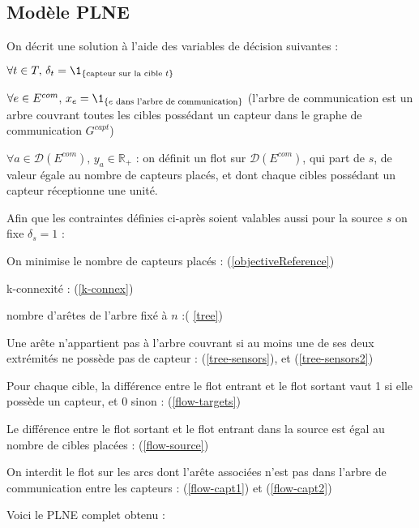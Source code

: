 \documentclass[12pt]{article}
\begin{document}
\subsection{Modèle PLNE}

\noindent On décrit une solution à l'aide des variables de décision suivantes :
\begin{bulletlist}
  \item $\forall t\in T,\, \delta_t = \1_{\{\text{capteur sur la cible } t\}}$
  \item $\forall e\in E^{com},\, x_e = \1_{\{e \text{ dans l'arbre de communication}\}}$ (l'arbre de communication est un arbre couvrant toutes les cibles possédant un capteur dans le graphe de communication $G^{capt}$)
  \item $\forall a\in \mathcal{D}(E^{com}),\, y_a\in \mathbb{R}_+$ : on définit un flot sur $\mathcal{D}(E^{com})$, qui part de $s$, de valeur égale au nombre de capteurs placés, et dont chaque cibles possédant un capteur réceptionne une unité.
\end{bulletlist}

\bigskip

\noindent Afin que les contraintes définies ci-après soient valables aussi pour la source $s$ on fixe $\delta_s = 1$ :

\begin{bulletlist}
  \item On minimise le nombre de capteurs placés : (\ref{objectiveReference})
  \item k-connexité : (\ref{k-connex})
  \item nombre d'arêtes de l'arbre fixé à $n$ :( \ref{tree})
  \item Une arête n'appartient pas à l'arbre couvrant si au moins une de ses deux extrémités ne possède pas de capteur : (\ref{tree-sensors}), et (\ref{tree-sensors2})
  \item Pour chaque cible, la différence entre le flot entrant et le flot sortant vaut 1 si elle possède un capteur, et 0 sinon : (\ref{flow-targets})
  \item Le différence entre le flot sortant et le flot entrant dans la source est égal au nombre de cibles placées : (\ref{flow-source})
  \item On interdit le flot sur les arcs dont l'arête associées n'est pas dans l'arbre de communication entre les capteurs : (\ref{flow-capt1}) et (\ref{flow-capt2})
\end{bulletlist}

\noindent Voici le PLNE complet obtenu :
\end{document}
